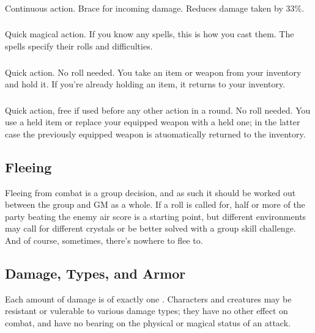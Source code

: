 \begin{multicols}{2}
        \subsubsection{}
            Continuous action. Brace for incoming damage. Reduces damage taken by 33\%.

        \subsubsection{}
            Quick magical action.  If you know any spells, this is how you cast them. The spells specify their rolls and difficulties.

        \subsubsection{}
            Quick action. No roll needed. You take an item or weapon from your inventory and hold it. If you're already holding an item, it returns to your inventory.

        \subsubsection{}
            Quick action, free if used before any other action in a round. No roll needed. You use a held item or replace your equipped weapon with a held one; in the latter case the previously equipped weapon is atuomatically returned to the inventory.

    \subsection{Fleeing}
        Fleeing from combat is a group decision, and as such it should be worked out between the group and GM as a whole. If a roll is called for, half or more of the party beating the  enemy air score is a starting point, but different environments may call for different crystals or be better solved with a group skill challenge. And of course, sometimes, there's nowhere to flee to.

    \begin{center}
    \end{center}

    \subsection{Damage, Types, and Armor}
        Each amount of damage is of exactly one . Characters and creatures may be resistant or vulerable to various damage types; they have no other effect on combat, and have no bearing on the physical or magical status of an attack.


\end{multicols}

